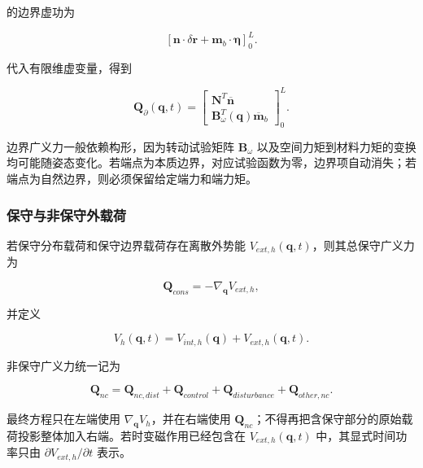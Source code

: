 的边界虚功为

\begin{equation}
\label{eq:galerkin-2-77}
\left\lbrack \mathbf{n} \cdot \delta\mathbf{r} + \mathbf{m}_{b} \cdot \bm{\eta} \right\rbrack_{0}^{L}.
\end{equation}

代入有限维虚变量，得到

\begin{equation}
\label{eq:galerkin-2-78}
\boxed{\mathbf{Q}_{\partial}\left( \mathbf{q},t \right) = \begin{bmatrix}
\mathbf{N}^{T}\overline{\mathbf{n}} \\
\mathbf{B}_{\omega}^{T}\left( \mathbf{q} \right){\overline{\mathbf{m}}}_{b}
\end{bmatrix}_{0}^{L}.}
\end{equation}

边界广义力一般依赖构形，因为转动试验矩阵 \(\mathbf{B}_{\omega}\) 以及空间力矩到材料力矩的变换均可能随姿态变化。若端点为本质边界，对应试验函数为零，边界项自动消失；若端点为自然边界，则必须保留给定端力和端力矩。

\subsubsection{保守与非保守外载荷}\label{sec:galerkin-2-5-5}

若保守分布载荷和保守边界载荷存在离散外势能 \(V_{ext,h}\left( \mathbf{q},t \right)\)，则其总保守广义力为

\begin{equation}
\label{eq:galerkin-2-79}
\mathbf{Q}_{cons} = - \nabla_{\mathbf{q}}V_{ext,h},
\end{equation}

并定义

\begin{equation}
\label{eq:galerkin-2-80}
V_{h}\left( \mathbf{q},t \right) = V_{int,h}\left( \mathbf{q} \right) + V_{ext,h}\left( \mathbf{q},t \right).
\end{equation}

非保守广义力统一记为

\begin{equation}
\label{eq:galerkin-2-81}
\mathbf{Q}_{nc} = \mathbf{Q}_{nc,dist} + \mathbf{Q}_{control} + \mathbf{Q}_{disturbance} + \mathbf{Q}_{other,nc}.
\end{equation}

最终方程只在左端使用 \(\nabla_{\mathbf{q}}V_{h}\)，并在右端使用 \(\mathbf{Q}_{nc}\)；不得再把含保守部分的原始载荷投影整体加入右端。若时变磁作用已经包含在 \(V_{ext,h}\left( \mathbf{q},t \right)\) 中，其显式时间功率只由 \(\partial V_{ext,h}/\partial t\) 表示。

